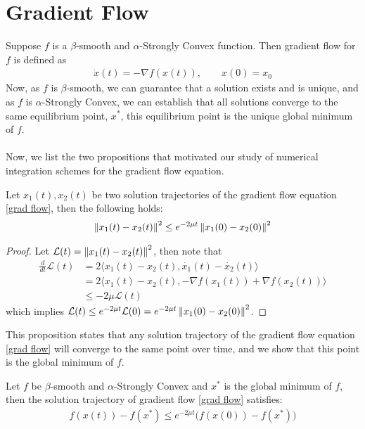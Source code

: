 \section{Gradient Flow}
Suppose $f$ is a $\beta$-smooth and $\alpha$-Strongly
Convex function. Then gradient flow for $f$ is defined as
\begin{align}\label{grad flow}
\dot{x}(t) = - \nabla f(x(t)), \qquad x(0) = x_{0}
\end{align}
Now, as $f$ is $\beta$-smooth, we can guarantee that a
solution exists and is unique, and as $f$ is $\alpha$-Strongly
Convex, we can establish that all solutions converge to
the same equilibrium point, $x^{*}$, this equilibrium
point is the unique global minimum of $f$. \\
\\
Now, we list the two propositions that motivated our
study of numerical integration schemes for the gradient
flow equation.
\begin{prop}
  Let $x_{1}(t), x_{2}(t)$ be two solution trajectories
  of the gradient flow equation \eqref{grad flow}, then
  the following holds:
\begin{align*}
\left\lVert x_{1}(t) - x_{2}(t)\right\rVert^{2} \leq e^{-2 \mu t} \left\lVert x_{1}(0) - x_{2}(0)\right\rVert^{2}
\end{align*}
\end{prop}
\begin{proof}
Let $\mathcal{L}(t) = \left\lVert x_{1}(t) - x_{2}(t)\right\rVert^{2}$, then note that
\begin{align*}
\frac{d}{dt}\mathcal{L}(t) &= 2 \langle x_{1}(t) - x_{2}(t), \dot{x_{1}}(t) - \dot{x_{2}}(t)  \rangle  \\
&= 2 \langle x_{1}(t) - x_{2}(t), -\nabla f(x_{1}(t)) + \nabla f(x_{2}(t))  \rangle  \\
& \leq - 2 \mu \mathcal{L}(t)
\end{align*}
which implies $\mathcal{L}(t) \leq e^{-2 \mu t} \mathcal{L}(0) = e^{-2 \mu t} \left\lVert x_{1}(0) - x_{2}(0)\right\rVert^{2} $.
\end{proof}
This proposition states that any solution trajectory
of the gradient flow equation \eqref{grad flow} will
converge to the same point over time, and we show that
this point is the global minimum of $f$.
\begin{prop}
  Let $f$ be $\beta$-smooth and $\alpha$-Strongly Convex
  and $x^{*}$ is the global minimum of $f$, then the
  solution trajectory of gradient flow \eqref{grad flow} satisfies:
\begin{align*}
f(x(t)) - f(x^{*}) \leq e^{-2 \mu t} \big( f(x(0)) - f(x^{*}) \big)
\end{align*}
\end{prop}
